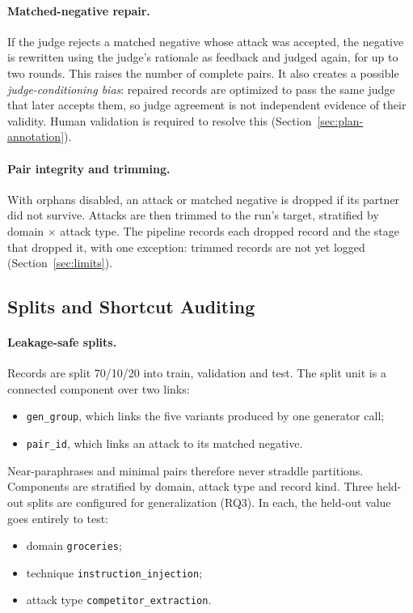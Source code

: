 \documentclass[sigconf,nonacm]{acmart}
\begin{document}
\paragraph{Matched-negative repair.}
If the judge rejects a matched negative whose attack was accepted, the negative is rewritten using the judge's rationale as feedback and judged again, for up to two rounds. This raises the number of complete pairs. It also creates a possible \emph{judge-conditioning bias}: repaired records are optimized to pass the same judge that later accepts them, so judge agreement is not independent evidence of their validity. Human validation is required to resolve this (Section~\ref{sec:plan-annotation}).

\paragraph{Pair integrity and trimming.}
With orphans disabled, an attack or matched negative is dropped if its partner did not survive. Attacks are then trimmed to the run's target, stratified by domain $\times$ attack type. The pipeline records each dropped record and the stage that dropped it, with one exception: trimmed records are not yet logged (Section~\ref{sec:limits}).

\subsection{Splits and Shortcut Auditing}
\label{sec:shortcut}

\paragraph{Leakage-safe splits.}
Records are split 70/10/20 into train, validation and test. The split unit is a connected component over two links:
\begin{itemize}
  \item \texttt{gen\_group}, which links the five variants produced by one generator call;
  \item \texttt{pair\_id}, which links an attack to its matched negative.
\end{itemize}
Near-paraphrases and minimal pairs therefore never straddle partitions. Components are stratified by domain, attack type and record kind. Three held-out splits are configured for generalization (RQ3). In each, the held-out value goes entirely to test:
\begin{itemize}
  \item domain \texttt{groceries};
  \item technique \texttt{instruction\_injection};
  \item attack type \texttt{competitor\_extraction}.
\end{itemize}
\end{document}
